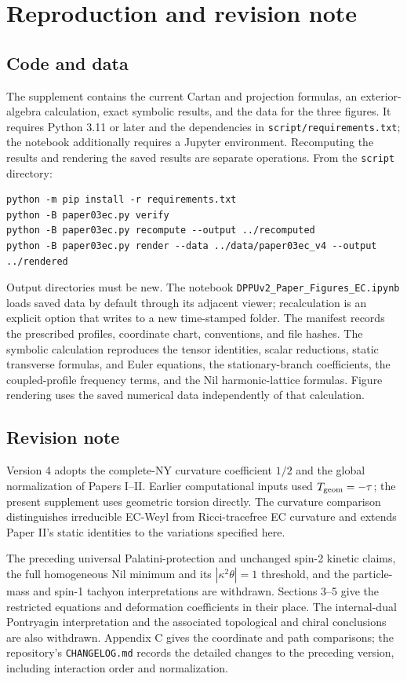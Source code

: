 \section{Reproduction and revision note}

\subsection{Code and data}

The supplement contains the current Cartan and projection formulas, an exterior-algebra calculation, exact symbolic results, and the data for the three figures. It requires Python 3.11 or later and the dependencies in \texttt{script/requirements.txt}; the notebook additionally requires a Jupyter environment. Recomputing the results and rendering the saved results are separate operations. From the \texttt{script} directory:

\begin{lstlisting}
python -m pip install -r requirements.txt
python -B paper03ec.py verify
python -B paper03ec.py recompute --output ../recomputed
python -B paper03ec.py render --data ../data/paper03ec_v4 --output ../rendered
\end{lstlisting}

Output directories must be new. The notebook \texttt{DPPUv2\_Paper\_Figures\_EC.ipynb} loads saved data by default through its adjacent viewer; recalculation is an explicit option that writes to a new time-stamped folder. The manifest records the prescribed profiles, coordinate chart, conventions, and file hashes. The symbolic calculation reproduces the tensor identities, scalar reductions, static transverse formulas, and Euler equations, the stationary-branch coefficients, the coupled-profile frequency terms, and the Nil harmonic-lattice formulas. Figure rendering uses the saved numerical data independently of that calculation.

\subsection{Revision note}

Version 4 adopts the complete-NY curvature coefficient $1/2$ and the global normalization of Papers I--II. Earlier computational inputs used $T_{\rm geom}=-\tau$; the present supplement uses geometric torsion directly. The curvature comparison distinguishes irreducible EC-Weyl from Ricci-tracefree EC curvature and extends Paper II's static identities to the variations specified here.

The preceding universal Palatini-protection and unchanged spin-2 kinetic claims, the full homogeneous Nil minimum and its $|\kappa^2\theta|=1$ threshold, and the particle-mass and spin-1 tachyon interpretations are withdrawn. Sections 3--5 give the restricted equations and deformation coefficients in their place. The internal-dual Pontryagin interpretation and the associated topological and chiral conclusions are also withdrawn. Appendix C gives the coordinate and path comparisons; the repository's \texttt{CHANGELOG.md} records the detailed changes to the preceding version, including interaction order and normalization.
